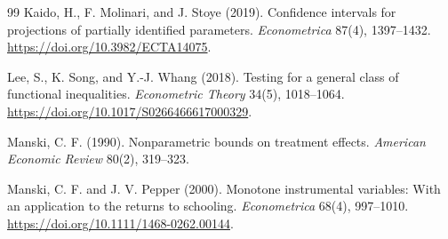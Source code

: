 \documentclass[11pt]{article}
\theoremstyle{definition}
\theoremstyle{plain}
\theoremstyle{remark}
\begin{document}
\begin{thebibliography}{99}
Kaido, H., F. Molinari, and J. Stoye (2019).
\newblock Confidence intervals for projections of partially identified parameters.
\newblock \emph{Econometrica} 87(4), 1397--1432.
\newblock \url{https://doi.org/10.3982/ECTA14075}.

Lee, S., K. Song, and Y.-J. Whang (2018).
\newblock Testing for a general class of functional inequalities.
\newblock \emph{Econometric Theory} 34(5), 1018--1064.
\newblock \url{https://doi.org/10.1017/S0266466617000329}.

Manski, C. F. (1990).
\newblock Nonparametric bounds on treatment effects.
\newblock \emph{American Economic Review} 80(2), 319--323.

Manski, C. F. and J. V. Pepper (2000).
\newblock Monotone instrumental variables: With an application to the returns to schooling.
\newblock \emph{Econometrica} 68(4), 997--1010.
\newblock \url{https://doi.org/10.1111/1468-0262.00144}.
\end{thebibliography}
\end{document}
